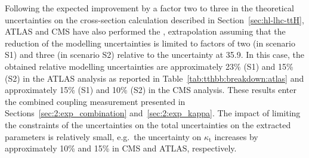 Following the expected improvement by a factor two to three in the theoretical uncertainties on the \ttHF cross-section calculation described in Section~\ref{sec:hl-lhc-ttH}, ATLAS and CMS have also performed the \ttH, \Htobb extrapolation assuming that the reduction of the \ttHF modelling uncertainties is limited to factors of two (in scenario S1) and three (in scenario S2) relative to the uncertainty at 35.9\fbinv.
In this case, the obtained relative \ttHF modelling uncertainties are approximately 23\% (S1) and 15\% (S2) in the ATLAS analysis as reported in Table~\ref{tab:tthbb:breakdown:atlas} and approximately 15\% (S1) and 10\% (S2) in the CMS analysis. These results enter the combined coupling measurement presented in Sections~\ref{sec:2:exp_combination} and~\ref{sec:2:exp_kappa}. The impact of limiting the constraints of the \ttHF uncertainties on the total uncertainties on the extracted parameters is relatively small, e.g.\ the uncertainty on $\kappa_{\text{t}}$ increases by approximately 10\% and 15\% in CMS and ATLAS, respectively. 
